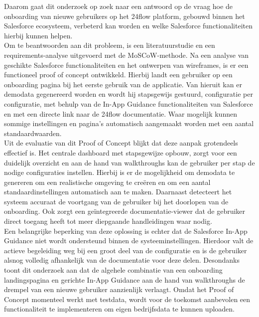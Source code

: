 Daarom gaat dit onderzoek op zoek naar een antwoord op de vraag hoe de onboarding van nieuwe gebruikers op het 24flow platform, gebouwd binnen het Salesforce ecosysteem, verbeterd kan worden en welke Salesforce functionaliteiten hierbij kunnen helpen.
\\

Om te beantwoorden aan dit probleem, is een literatuurstudie en een requirements-analyse uitgevoerd met de MoSCoW-methode. Na een analyse van geschikte Salesforce functionaliteiten en het ontwerpen van wireframes, is er een functioneel proof of concept ontwikkeld. Hierbij landt een gebruiker op een onboarding pagina bij het eerste gebruik van de applicatie. Van hieruit kan er demodata gegenereerd worden en wordt hij stapsgewijs gestuurd, configuratie per configuratie, met behulp van de In-App Guidance functionaliteiten van Salesforce en met een directe link naar de 24flow documentatie. Waar mogelijk kunnen sommige instellingen en pagina's automatisch aangemaakt worden met een aantal standaardwaarden.
\\

Uit de evaluatie van dit Proof of Concept blijkt dat deze aanpak grotendeels effectief is. Het centrale dashboard met stapsgewijze opbouw, zorgt voor een duidelijk overzicht en aan de hand van walkthroughs kan de gebruiker per stap de nodige configuraties instellen. Hierbij is er de mogelijkheid om demodata te genereren om een realistische omgeving te creëren en om een aantal standaardinstellingen automatisch aan te maken. Daarnaast detecteert het systeem accuraat de voortgang van de gebruiker bij het doorlopen van de onboarding. Ook zorgt een geïntegreerde documentatie-viewer dat de gebruiker direct toegang heeft tot meer diepgaande handleidingen waar nodig. 
\\

Een belangrijke beperking van deze oplossing is echter dat de 
Salesforce In-App Guidance niet wordt ondersteund binnen de systeeminstellingen. Hierdoor valt de actieve begeleiding weg bij een groot deel van de configuratie en is de gebruiker alsnog volledig afhankelijk van de documentatie voor deze delen. Desondanks toont dit onderzoek aan dat de algehele combinatie van een onboarding landingspagina en gerichte In-App Guidance aan de hand van walkthroughs de drempel van een nieuwe gebruiker aanzienlijk verlaagt. Omdat het Proof of Concept momenteel werkt met testdata, wordt voor de toekomst aanbevolen een functionaliteit te implementeren om eigen bedrijfsdata te kunnen uploaden.
